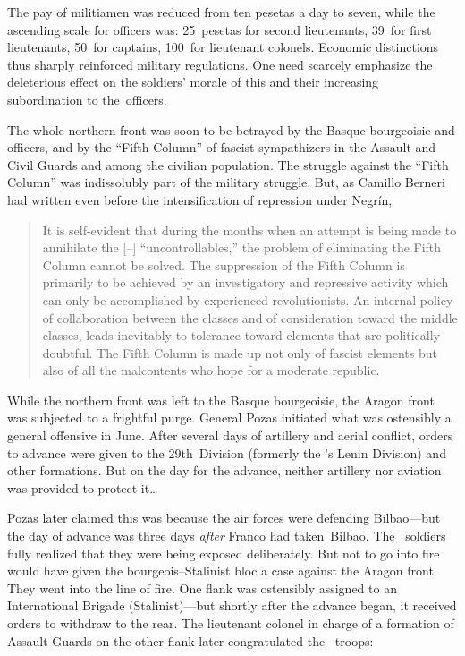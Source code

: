 The pay of militiamen was reduced from ten pesetas a day to seven, while the ascending scale for officers was: 25~pesetas for second lieutenants, 39~for first lieutenants, 50~for captains, 100~for lieutenant colonels. Economic distinctions thus sharply reinforced military regulations. One need scarcely emphasize the deleterious effect on the soldiers’ morale of this and their increasing subordination to the~officers.

The whole northern front was soon to be betrayed by the Basque bourgeoisie and officers, and by the ``Fifth Column'' of fascist sympathizers in the Assault and Civil Guards and among the civilian population. The struggle against the ``Fifth Column'' was indissolubly part of the military struggle. But, as Camillo Berneri had written even before the intensification of repression under Negr\'in,

\begin{quotation}
  It is self-evident that during the months when an attempt is being made to annihilate the [\POUM--\CNT] “uncontrollables,” the problem of eliminating the Fifth Column cannot be solved. The suppression of the Fifth Column is primarily to be achiev\-ed by an investigatory and repressive activity which can only be accomplished by experienced revolutionists. An internal policy of collaboration between the classes and of consideration toward the middle classes, leads inevitably to tolerance toward elements that are politically doubtful. The Fifth Column is made up not only of fascist elements but also of all the malcontents who hope for a moderate republic.
\end{quotation}

While the northern front was left to the Basque bourgeoisie, the Aragon front was subjected to a frightful purge. General Pozas initiated what was ostensibly a general offensive in June. After several days of artillery and aerial conflict, orders to advance were given to the 29th~Division (formerly the \POUM’s Lenin Division) and other formations. But on the day for the advance, neither artillery nor aviation was provided to protect it\dots\

\indexSPozas{}\indexPOUM{}
Pozas later claimed this was because the air forces were defending Bilbao---but the day of advance was three days \emph{after} Franco had taken~Bilbao. The \POUM\ soldiers fully realized that they were being exposed deliberately. But not to go into fire would have given the bourgeois--Stalinist bloc a case against the Aragon front. They went into the line of fire. One flank was ostensibly assigned to an International Brigade (Stalinist)---but shortly after the advance began, it received orders to withdraw to the rear. The lieutenant colonel in charge of a formation of Assault Guards on the other flank later congratulated the \POUM\ troops: 

